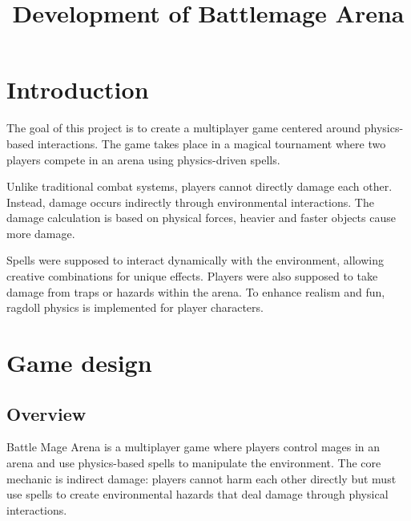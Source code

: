 \documentclass[conference]{IEEEtran}
\begin{document}
    \title{Development of Battlemage Arena
    }   

    \author{
    \and
    \and
    \and

    }

    \maketitle


    \section{Introduction}\label{sec:introduction}

    The goal of this project is to create a multiplayer game centered around physics-based interactions.
    The game takes place in a magical tournament where two players compete in an arena using physics-driven spells.

    Unlike traditional combat systems, players cannot directly damage each other.
    Instead, damage occurs indirectly through environmental interactions.
    The damage calculation is based on physical forces, heavier and faster objects cause more damage.

    Spells were supposed to interact dynamically with the environment, allowing creative combinations for unique effects.
    Players were also supposed to take damage from traps or hazards within the arena.
    To enhance realism and fun, ragdoll physics is implemented for player characters.


    \section{Game design}\label{sec:game-design}

    \subsection{Overview}\label{subsec:overview}
    Battle Mage Arena is a multiplayer game where players control mages in an arena and use physics-based spells to manipulate the environment.
    The core mechanic is indirect damage: players cannot harm each other directly but must use spells to create environmental hazards that deal damage through physical interactions.
\end{document}
